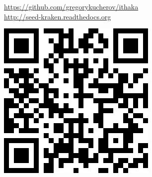 \documentclass[portrait,final,a0paper,fontscale=0.277]{baposter}
\begin{document}
\begin{poster}
{ \hspace{-2.0em}
  \begin{minipage}{\textwidth}
  \begin{minipage}{0.80\linewidth}
   {\smaller 
  \url{https://github.com/gregorykucherov/ithaka}\\
  \url{http://seed-kraken.readthedocs.org} 
   }
  \end{minipage}\hfill%
  \begin{minipage}{0.20\linewidth}
  \hfill\includegraphics[width=\linewidth]{images/qrcode-ithaka.png}
  \end{minipage}
  \end{minipage}
   \vspace{0.3em}
  }



\end{poster}
\end{document}
